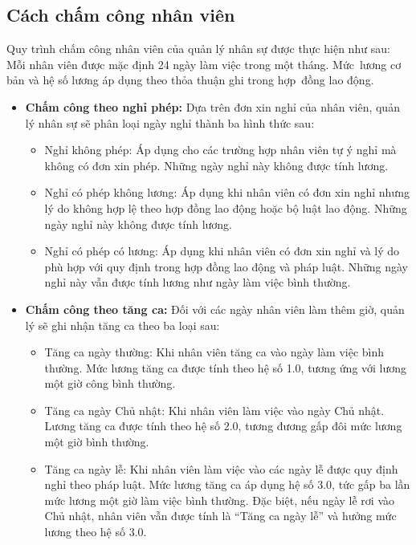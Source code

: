 \documentclass[a4paper,12pt]{report}
\begin{document}
\subsection{Cách chấm công nhân viên}
\quad Quy trình chấm công nhân viên của quản lý nhân sự được thực hiện như sau: Mỗi nhân viên được mặc định 24 ngày làm việc trong một tháng. Mức~lương cơ bản và hệ số lương áp dụng theo thỏa thuận ghi trong hợp~đồng lao động.
\begin{itemize}
    \item \textbf{Chấm công theo nghỉ phép:} Dựa trên đơn xin nghỉ của nhân viên, quản lý nhân sự sẽ phân loại ngày nghỉ thành ba hình thức sau:
    \begin{itemize}
        \item Nghỉ không phép: Áp dụng cho các trường hợp nhân viên tự ý nghỉ mà không có đơn xin phép. Những ngày nghỉ này không được tính lương.
        \item Nghỉ có phép không lương: Áp dụng khi nhân viên có đơn xin nghỉ nhưng lý do không hợp lệ theo hợp đồng lao động hoặc bộ luật lao động. Những ngày nghỉ này không được tính lương.
        \item Nghỉ có phép có lương: Áp dụng khi nhân viên có đơn xin nghỉ và lý do phù hợp với quy định trong hợp đồng lao động và pháp luật. Những ngày nghỉ này vẫn được tính lương như ngày làm việc bình thường.
    \end{itemize}
    \item \textbf{Chấm công theo tăng ca:} Đối với các ngày nhân viên làm thêm giờ, quản lý sẽ ghi nhận tăng ca theo ba loại sau:
        \begin{itemize}
            \item Tăng ca ngày thường: Khi nhân viên tăng ca vào ngày làm việc bình thường. Mức lương tăng ca được tính theo hệ số 1.0, tương ứng với lương một giờ công bình thường.
            \item Tăng ca ngày Chủ nhật: Khi nhân viên làm việc vào ngày Chủ nhật. Lương tăng ca được tính theo hệ số 2.0, tương đương gấp đôi mức lương một giờ bình thường.
            \item Tăng ca ngày lễ: Khi nhân viên làm việc vào các ngày lễ được quy định nghỉ theo pháp luật. Mức lương tăng ca áp dụng hệ số 3.0, tức gấp ba lần mức lương một giờ làm việc bình thường. Đặc biệt, nếu ngày lễ rơi vào Chủ nhật, nhân viên vẫn được tính là “Tăng ca ngày lễ” và hưởng mức lương theo hệ số 3.0.
        \end{itemize}
\end{itemize}
\end{document}
